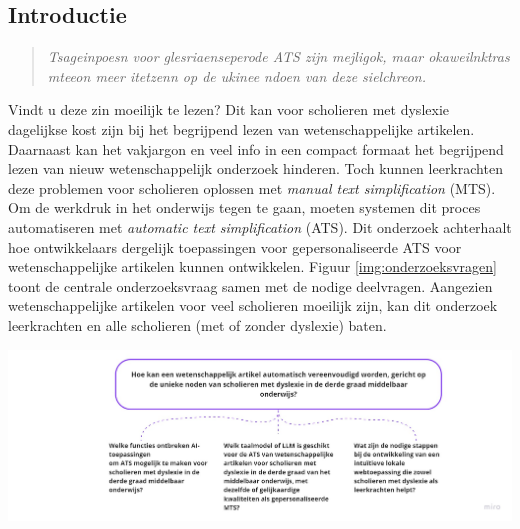 \documentclass[a0,portrait]{hogent-poster}
\begin{document}
\begin{multicols}{2} %

\section{Introductie}




\begin{quotation}
\textit{Tsageinpoesn voor glesriaenseperode ATS zijn mejligok, maar okaweilnktras mteeon meer itetzenn op de ukinee ndoen van deze sielchreon.}
\end{quotation}

Vindt u deze zin moeilijk te lezen? Dit kan voor scholieren met dyslexie dagelijkse kost zijn bij het begrijpend lezen van wetenschappelijke artikelen. Daarnaast kan het vakjargon en veel info in een compact formaat het begrijpend lezen van nieuw wetenschappelijk onderzoek hinderen. Toch kunnen leerkrachten deze problemen voor scholieren oplossen met \textit{manual text simplification} (MTS). Om de werkdruk in het onderwijs tegen te gaan, moeten systemen dit proces automatiseren met \textit{automatic text simplification} (ATS). Dit onderzoek achterhaalt hoe ontwikkelaars dergelijk toepassingen voor gepersonaliseerde ATS voor wetenschappelijke artikelen kunnen ontwikkelen. Figuur \ref{img:onderzoeksvragen} toont de centrale onderzoeksvraag samen met de nodige deelvragen. Aangezien wetenschappelijke artikelen voor veel scholieren moeilijk zijn, kan dit onderzoek leerkrachten en alle scholieren (met of zonder dyslexie) baten.

\begin{center}
	\captionsetup{type=figure}
	\includegraphics[width=1.0\linewidth]{figures/onderzoeksvragen.jpg}
	\label{img:onderzoeksvragen}
\end{center}


\end{multicols}
\end{document}
